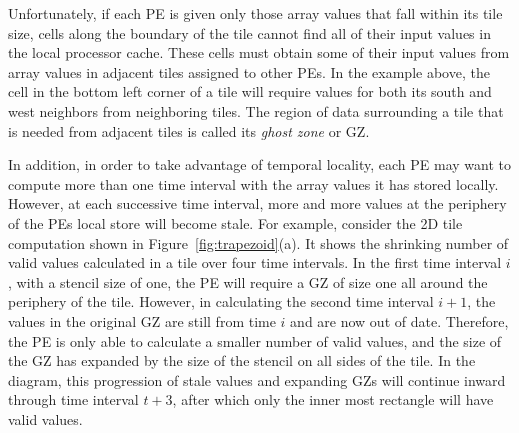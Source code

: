 \documentclass[preprint,nocopyrightspace]{styles/sigplanconf}
\begin{document}
Unfortunately, if each PE is given only those array values that fall within its
tile size, cells along the boundary of the tile cannot find all of their input
values in the local processor cache.  These cells must obtain some of their
input values from array values in adjacent tiles assigned to other PEs.  In the
example above, the cell in the bottom left corner of a tile will require values
for both its south and west neighbors from neighboring tiles.  The region of
data surrounding a tile that is needed from adjacent tiles is called its {\em
ghost zone} or GZ.

In addition, in order to take advantage of temporal locality, each PE may want
to compute more than one time interval with the array values it has stored
locally.  However, at each successive time interval, more and more values at
the periphery of the PEs local store will become stale.  For example, consider
the 2D tile computation shown in Figure~\ref{fig:trapezoid}(a).  It shows the
shrinking number of valid values calculated in a tile over four time intervals.
In the first time interval $i$, with a stencil size of one, the PE will require
a GZ of size one all around the periphery of the tile.  However, in calculating
the second time interval $i+1$, the values in the original GZ are still from
time $i$ and are now out of date.  Therefore, the PE is only able to calculate
a smaller number of valid values, and the size of the GZ has expanded by the
size of the stencil on all sides of the tile.  In the diagram, this progression
of stale values and expanding GZs will continue inward through time interval
$t+3$, after which only the inner most rectangle will have valid values.
\end{document}
